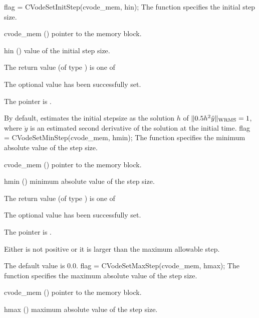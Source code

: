 {
flag = CVodeSetInitStep(cvode\_mem, hin);
}
{
  The function  specifies the initial step size.
}
{
  \begin{args}
  \item[cvode\_mem] ()
    pointer to the {\cvode} memory block.
  \item[hin] ()
    value of the initial step size.
  \end{args}
}
{
  The return value  (of type ) is one of
  \begin{args}
  \item[\Id{CV\_SUCCESS}] 
    The optional value has been successfully set.
  \item[\Id{CV\_MEM\_NULL}]
    The  pointer is .
  \end{args}
}
{
  By default, {\cvode} estimates the initial stepsize as the solution $h$ 
  of $\| 0.5 h^2 \ddot y \|_{\mbox{\scriptsize WRMS}} = 1$,
  where $\ddot y$ is an estimated second derivative of the solution at the
  initial time.
}
{
flag = CVodeSetMinStep(cvode\_mem, hmin);
}
{
  The function  specifies the minimum absolute
  value of the step size.
}
{
  \begin{args}
  \item[cvode\_mem] ()
    pointer to the {\cvode} memory block.
  \item[hmin] ()
    minimum absolute value of the step size.
  \end{args}
}
{
  The return value  (of type ) is one of
  \begin{args}
  \item[\Id{CV\_SUCCESS}] 
    The optional value has been successfully set.
  \item[\Id{CV\_MEM\_NULL}]
    The  pointer is .
  \item[\Id{CV\_ILL\_INPUT}]
    Either  is not positive or it is larger than the maximum allowable step.
  \end{args}
}
{
  The default value is $0.0$.
}
{
flag = CVodeSetMaxStep(cvode\_mem, hmax);
}
{
  The function  specifies the maximum absolute
  value of the step size.
}
{
  \begin{args}
  \item[cvode\_mem] ()
    pointer to the {\cvode} memory block.
  \item[hmax] ()
    maximum absolute value of the step size.
  \end{args}
}

